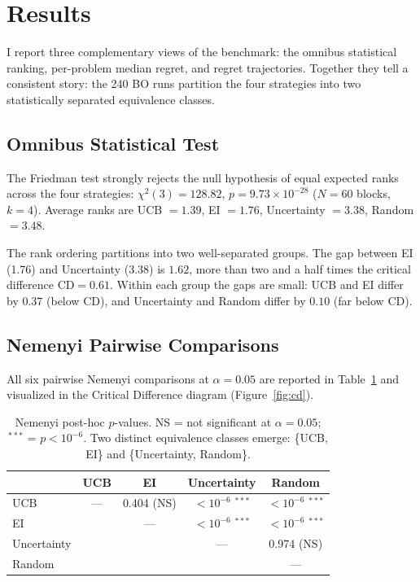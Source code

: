 \section{Results}
\label{sec:results}

I report three complementary views of the benchmark: the omnibus
statistical ranking, per-problem median regret, and regret trajectories.
Together they tell a consistent story: the 240 BO runs partition the
four strategies into two statistically separated equivalence classes.

\subsection{Omnibus Statistical Test}
\label{sec:friedman}

The Friedman test strongly rejects the null hypothesis of equal expected
ranks across the four strategies:
$\chi^2(3) = 128.82$, $p = 9.73 \times 10^{-28}$ ($N = 60$ blocks,
$k = 4$).
Average ranks are
UCB $= 1.39$, EI $= 1.76$, Uncertainty $= 3.38$, Random $= 3.48$.

The rank ordering partitions into two well-separated groups.
The gap between EI (1.76) and Uncertainty (3.38) is $1.62$, more than
two and a half times the critical difference $\mathrm{CD} = 0.61$.
Within each group the gaps are small: UCB and EI differ by $0.37$
(below CD), and Uncertainty and Random differ by $0.10$ (far below CD).

\subsection{Nemenyi Pairwise Comparisons}
\label{sec:nemenyi}

All six pairwise Nemenyi comparisons at $\alpha = 0.05$ are reported in
Table~\ref{tab:nemenyi} and visualized in the Critical Difference diagram
(Figure~\ref{fig:cd}).

\begin{table}[t]
\centering
\caption{Nemenyi post-hoc $p$-values.
  NS = not significant at $\alpha = 0.05$; ${}^{***}$ = $p < 10^{-6}$.
  Two distinct equivalence classes emerge: \{UCB, EI\} and
  \{Uncertainty, Random\}.}
\label{tab:nemenyi}
\begin{tabular}{lcccc}
\toprule
         & UCB     & EI      & Uncertainty & Random \\
\midrule
UCB      & —       & 0.404 \scriptsize{(NS)} & $<\!10^{-6}$ ${}^{***}$ & $<\!10^{-6}$ ${}^{***}$ \\
EI       &         & —       & $<\!10^{-6}$ ${}^{***}$ & $<\!10^{-6}$ ${}^{***}$ \\
Uncertainty &      &         & —           & 0.974 \scriptsize{(NS)} \\
Random   &         &         &             & — \\
\bottomrule
\end{tabular}
\end{table}

